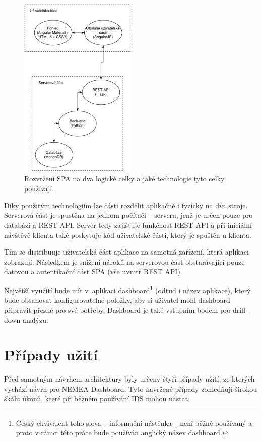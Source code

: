 \begin{figure}[ht]
    \centering
    \includegraphics[width=0.5\textwidth]{fig/SPA.pdf}
    \caption{Rozvržení SPA na dva logické celky a jaké technologie tyto celky používají.} \label{fig:system}
\end{figure}

Díky použitým technologiím lze části rozdělit aplikačně i fyzicky na dva stroje. Serverová část je spustěna na jednom počítači -- serveru, jenž je určen pouze pro databázi a REST API. Server tedy zajišťuje funkčnost REST API a při iniciální návštěvě klienta také poskytuje kód uživatelské části, který je spuštěn u klienta.

Tím se distribuuje uživatelská část aplikace na samotná zařízení, která aplikaci zobrazují. Následkem je snížení nároků na serverovou část obstarávající pouze datovou a autentikační část SPA (vše uvnitř REST API).

Největší využití bude mít v~aplikaci dashboard\footnote{Český ekvivalent toho slova -- informační nástěnka -- není běžně používaný a proto v rámci této práce bude používán anglický název dashboard.} (odtud i název aplikace), který bude obsahovat konfigurovatelné položky, aby si uživatel mohl dashboard připravit přesně pro své potřeby. Dashboard je také vstupním bodem pro drill-down analýzu.

\section{Případy užití}
Před samotným návrhem architektury byly určeny čtyři případy užití, ze kterých vychází návrh pro NEMEA Dashboard. Tyto navržené případy zohledňují širokou škálu úkonů, které při běžném používání IDS mohou nastat.

